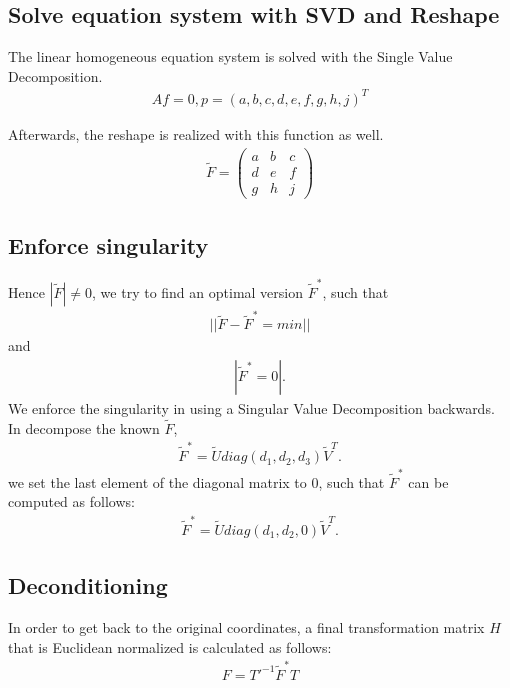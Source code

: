 \documentclass[a4paper,headings=small]{scrartcl}
\numberwithin{equation}{section} %
\numberwithin{figure}{section}   %
\begin{document}
  \subsection{Solve equation system with SVD and Reshape}

  The linear homogeneous equation system is solved with the Single Value Decomposition.
  \begin{align}
  Af=0, p=(a,b,c,d,e,f,g,h,j)^T 
  \end{align}

  Afterwards, the reshape is realized with this function as well.
  \begin{align}
  \tilde{F}=
  \left( \begin{array}{cccc}
  a & b & c \\
  d & e & f \\ 
  g & h & j
  \end{array} \right)
  \end{align}

  \subsection{Enforce singularity}
Hence $|\tilde{F}|\neq 0$, we try  to find an optimal version $\tilde{F}^*$, such that
  \begin{align}
  ||\tilde{F}-\tilde{F}^*=min||
  \end{align}
and
  \begin{align}
  |\tilde{F}^*=0|.
  \end{align}
We enforce the singularity in using a Singular Value Decomposition backwards.
In decompose the known $\tilde{F}$,
  \begin{align}
  \tilde{F}^*=\tilde{U} diag(d_1,d_2,d_3)\tilde{V}^T.
  \end{align}  
we set the last element of the diagonal matrix to 0, such that $\tilde{F}^*$ can be computed
as follows:
  \begin{align}
  \tilde{F}^*=\tilde{U} diag(d_1,d_2,0)\tilde{V}^T.
  \end{align}
  \subsection{Deconditioning}
In order to get back to the original coordinates, a final transformation matrix $H$ 
that is Euclidean normalized is calculated as follows:
\begin{align}
F=T'^{-1}\tilde{F}^{*}T
\end{align}
\end{document}
